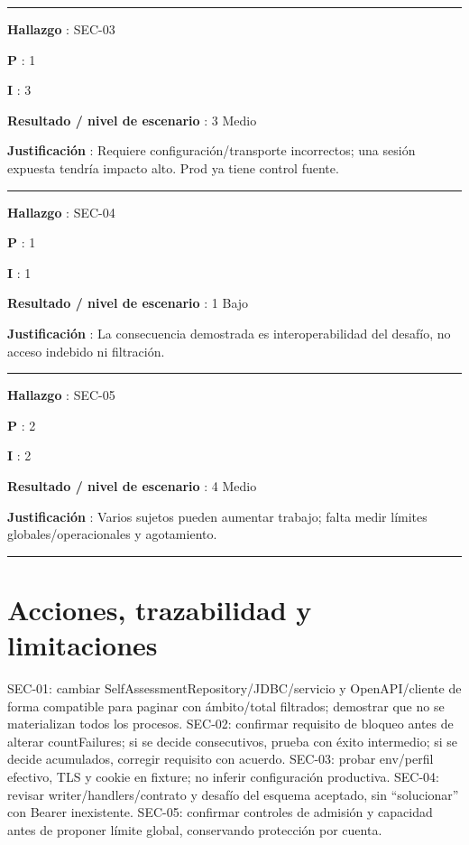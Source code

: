 \documentclass[12pt,a4paper]{report}
\begin{document}
\medskip\hrule\medskip

\textbf{Hallazgo }: SEC-03

\textbf{P }: 1

\textbf{I }: 3

\textbf{Resultado / nivel de escenario }: 3 Medio

\textbf{Justificación }: Requiere configuración/transporte incorrectos;
una sesión expuesta tendría impacto alto. Prod ya tiene control fuente.

\medskip\hrule\medskip

\textbf{Hallazgo }: SEC-04

\textbf{P }: 1

\textbf{I }: 1

\textbf{Resultado / nivel de escenario }: 1 Bajo

\textbf{Justificación }: La consecuencia demostrada es interoperabilidad
del desafío, no acceso indebido ni filtración.

\medskip\hrule\medskip

\textbf{Hallazgo }: SEC-05

\textbf{P }: 2

\textbf{I }: 2

\textbf{Resultado / nivel de escenario }: 4 Medio

\textbf{Justificación }: Varios sujetos pueden aumentar trabajo; falta
medir límites globales/operacionales y agotamiento.

\medskip\hrule\medskip


\chapter{Acciones, trazabilidad y
limitaciones}\label{AA4-semana-4-3-acciones-trazabilidad-y-limitaciones}

SEC-01: cambiar SelfAssessmentRepository/JDBC/servicio y OpenAPI/cliente
de forma compatible para paginar con ámbito/total filtrados; demostrar
que no se materializan todos los procesos. SEC-02: confirmar requisito
de bloqueo antes de alterar countFailures; si se decide consecutivos,
prueba con éxito intermedio; si se decide acumulados, corregir requisito
con acuerdo. SEC-03: probar env/perfil efectivo, TLS y cookie en
fixture; no inferir configuración productiva. SEC-04: revisar
writer/handlers/contrato y desafío del esquema aceptado, sin
``solucionar'' con Bearer inexistente. SEC-05: confirmar controles de
admisión y capacidad antes de proponer límite global, conservando
protección por cuenta.
\end{document}
